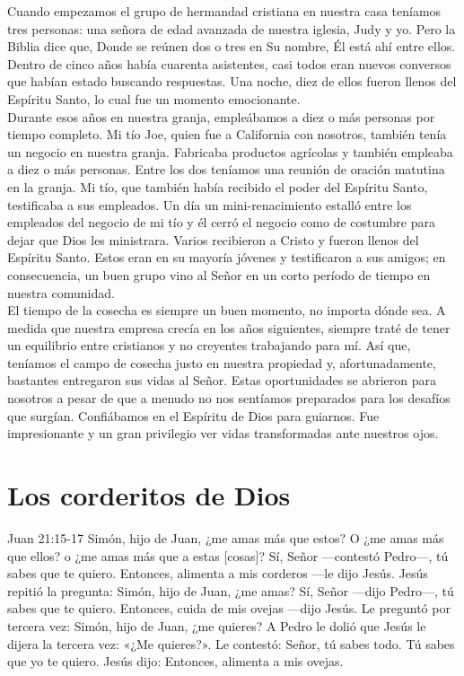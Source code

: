 \documentclass[twoside, 12pt]{book}
\begin{document}
Cuando empezamos el grupo de hermandad cristiana en nuestra casa teníamos tres personas: una señora de edad avanzada de nuestra iglesia, Judy y yo. Pero la Biblia dice que, Donde se reúnen dos o tres en Su nombre, Él está ahí entre ellos. Dentro de cinco años había cuarenta asistentes, casi todos eran nuevos conversos que habían estado buscando respuestas. Una noche, diez de ellos fueron llenos del Espíritu Santo, lo cual fue un momento emocionante.\\

Durante esos años en nuestra granja, empleábamos a diez o más personas por tiempo completo. Mi tío Joe, quien fue a California con nosotros, también tenía un negocio en nuestra granja. Fabricaba productos agrícolas y también empleaba a diez o más personas. Entre los dos teníamos una reunión de oración matutina en la granja. Mi tío, que también había recibido el poder del Espíritu Santo, testificaba a sus empleados. Un día un mini-renacimiento estalló entre los empleados del negocio de mi tío y él cerró el negocio como de costumbre para dejar que Dios les ministrara. Varios recibieron a Cristo y fueron llenos del Espíritu Santo. Estos eran en su mayoría jóvenes y testificaron a sus amigos; en consecuencia, un buen grupo vino al Señor en un corto período de tiempo en nuestra comunidad.\\

El tiempo de la cosecha es siempre un buen momento, no importa dónde sea. A medida que nuestra empresa crecía en los años siguientes, siempre traté de tener un equilibrio entre cristianos y no creyentes trabajando para mí. Así que, teníamos el campo de cosecha justo en nuestra propiedad y, afortunadamente, bastantes entregaron sus vidas al Señor. Estas oportunidades se abrieron para nosotros a pesar de que a menudo no nos sentíamos preparados para los desafíos que surgían. Confiábamos en el Espíritu de Dios para guiarnos. Fue impresionante y un gran privilegio ver vidas transformadas ante nuestros ojos.\\

\section{Los corderitos de Dios}

Juan 21:15-17 Simón, hijo de Juan, ¿me amas más que estos? O ¿me amas más que ellos? o ¿me amas más que a estas [cosas]? Sí, Señor —contestó Pedro—, tú sabes que te quiero. Entonces, alimenta a mis corderos —le dijo Jesús. Jesús repitió la pregunta: Simón, hijo de Juan, ¿me amas? Sí, Señor —dijo Pedro—, tú sabes que te quiero. Entonces, cuida de mis ovejas —dijo Jesús. Le preguntó por tercera vez: Simón, hijo de Juan, ¿me quieres? A Pedro le dolió que Jesús le dijera la tercera vez: «¿Me quieres?». Le contestó: Señor, tú sabes todo. Tú sabes que yo te quiero. Jesús dijo: Entonces, alimenta a mis ovejas.\\
\end{document}
